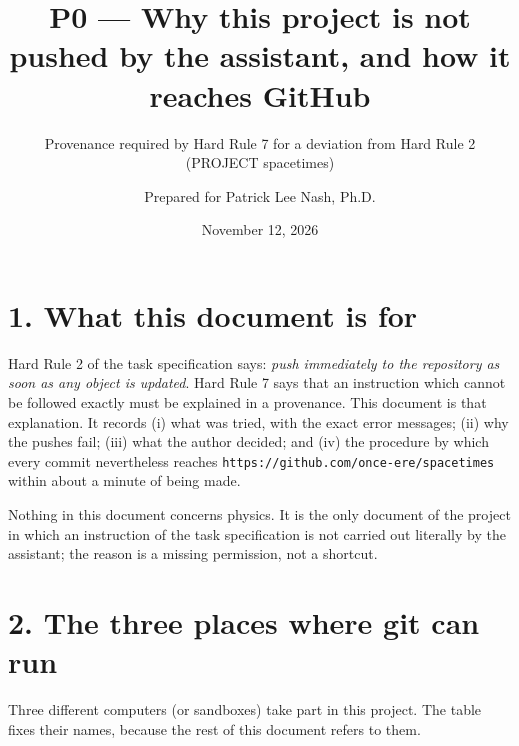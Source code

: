 \documentclass[
  10pt,
]{article}
\title{P0 --- Why this project is not pushed by the assistant, and how
it reaches GitHub}
\subtitle{Provenance required by Hard Rule 7 for a deviation from Hard
Rule 2 (PROJECT spacetimes)}
\author{Prepared for Patrick Lee Nash, Ph.D.}
\date{November 12, 2026}
\begin{document}
\maketitle

\hypertarget{what-this-document-is-for}{%
\section{1. What this document is for}\label{what-this-document-is-for}}

Hard Rule 2 of the task specification says: \emph{push immediately to
the repository as soon as any object is updated}. Hard Rule 7 says that
an instruction which cannot be followed exactly must be explained in a
provenance. This document is that explanation. It records (i) what was
tried, with the exact error messages; (ii) why the pushes fail; (iii)
what the author decided; and (iv) the procedure by which every commit
nevertheless reaches \texttt{https://github.com/once-ere/spacetimes}
within about a minute of being made.

Nothing in this document concerns physics. It is the only document of
the project in which an instruction of the task specification is not
carried out literally by the assistant; the reason is a missing
permission, not a shortcut.

\hypertarget{the-three-places-where-git-can-run}{%
\section{2. The three places where git can
run}\label{the-three-places-where-git-can-run}}

Three different computers (or sandboxes) take part in this project. The
table fixes their names, because the rest of this document refers to
them.
\end{document}

